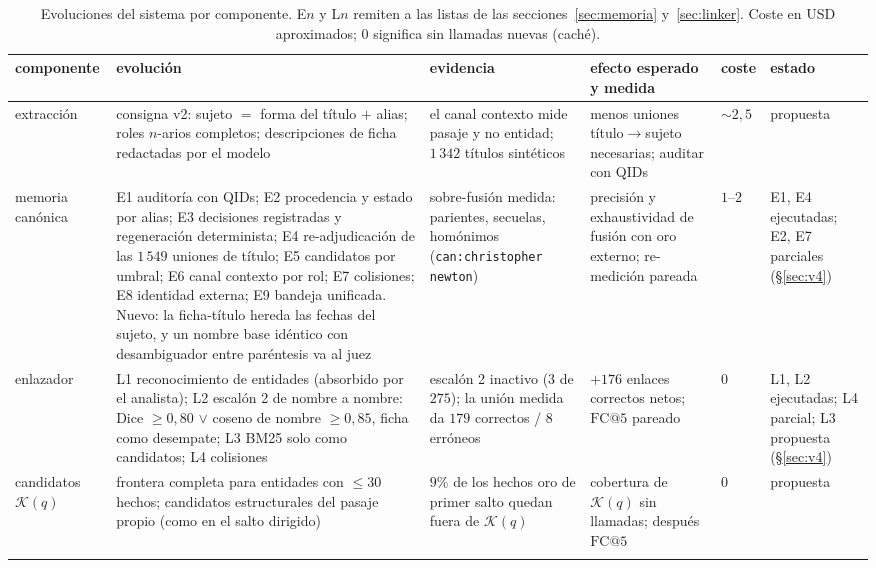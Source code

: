 \documentclass[11pt,a4paper]{article}
\begin{document}
\begin{table}[p]
\centering\scriptsize\setlength{\tabcolsep}{3pt}
\caption{Evoluciones del sistema por componente. E$n$ y L$n$ remiten a
las listas de las secciones~\ref{sec:memoria} y~\ref{sec:linker}. Coste en
USD aproximados; \guillemotleft{}0\guillemotright{} significa sin llamadas nuevas (caché).}
\label{tab:evoluciones}
\begin{tabular}{p{}p{}p{}p{}p{}p{}}
\toprule
componente & evolución & evidencia & efecto esperado y medida & coste & estado\\
\midrule
extracción & consigna v2: sujeto $=$ forma del título $+$ alias; roles $n$-arios completos; descripciones de ficha redactadas por el modelo & el canal contexto mide pasaje y no entidad; $1\,342$ títulos sintéticos & menos uniones título$\to$sujeto necesarias; auditar con QIDs & $\sim 2{,}5$ & propuesta\\
\addlinespace
memoria canónica & E1 auditoría con QIDs; E2 procedencia y estado por alias; E3 decisiones registradas y regeneración determinista; E4 re-adjudicación de las $1\,549$ uniones de título; E5 candidatos por umbral; E6 canal contexto por rol; E7 colisiones; E8 identidad externa; E9 bandeja unificada. Nuevo: la ficha-título hereda las fechas del sujeto, y un nombre base idéntico con desambiguador entre paréntesis va al juez & sobre-fusión medida: parientes, secuelas, homónimos (\texttt{can:christopher newton}) & precisión y exhaustividad de fusión con oro externo; re-medición pareada & $1$--$2$ & E1, E4 ejecutadas; E2, E7 parciales (\S\ref{sec:v4})\\
\addlinespace
enlazador & L1 reconocimiento de entidades (absorbido por el analista); L2 escalón 2 de nombre a nombre: Dice $\ge 0{,}80$ $\vee$ coseno de nombre $\ge 0{,}85$, ficha como desempate; L3 BM25 solo como candidatos; L4 colisiones & escalón 2 inactivo ($3$ de $275$); la unión medida da $179$ correctos / $8$ erróneos & $+176$ enlaces correctos netos; $\mathrm{FC@}5$ pareado & $0$ & L1, L2 ejecutadas; L4 parcial; L3 propuesta (\S\ref{sec:v4})\\
\addlinespace
candidatos $\mathcal{K}(q)$ & frontera completa para entidades con $\le 30$ hechos; candidatos estructurales del pasaje propio (como en el salto dirigido) & $9\%$ de los hechos oro de primer salto quedan fuera de $\mathcal{K}(q)$ & cobertura de $\mathcal{K}(q)$ sin llamadas; después $\mathrm{FC@}5$ & $0$ & propuesta\\
\addlinespace

\end{tabular}
\end{table}
\end{document}
